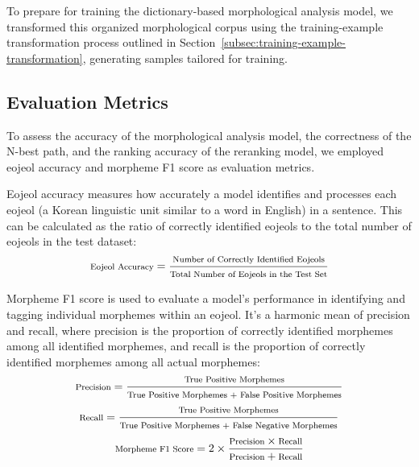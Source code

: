 \documentclass[AMS,STIX2COL]{WileyNJD-v2}
\begin{document}
    To prepare for training the dictionary-based morphological analysis model, we transformed this organized morphological corpus using the training-example transformation process outlined in Section~\ref{subsec:training-example-transformation}, generating samples tailored for training.

    \subsection{Evaluation Metrics}\label{subsec:evaluation-metrics}

    To assess the accuracy of the morphological analysis model, the correctness of the N-best path, and the ranking accuracy of the reranking model, we employed eojeol accuracy and morpheme F1 score as evaluation metrics.

    Eojeol accuracy measures how accurately a model identifies and processes each eojeol (a Korean linguistic unit similar to a word in English) in a sentence.
    This can be calculated as the ratio of correctly identified eojeols to the total number of eojeols in the test dataset:
    \vspace{1mm}
    \[
        \footnotesize
        \text{Eojeol Accuracy} = \frac{\text{Number of Correctly Identified Eojeols}}{\text{Total Number of Eojeols in the Test Set}}
    \]
    \vspace{0.5mm}

    Morpheme F1 score is used to evaluate a model's performance in identifying and tagging individual morphemes within an eojeol.
    It's a harmonic mean of precision and recall, where precision is the proportion of correctly identified morphemes among all identified morphemes, and recall is the proportion of correctly identified morphemes among all actual morphemes:
    \vspace{1mm}
    \[
        \footnotesize
        \text{Precision} = \frac{\text{True Positive Morphemes}}{\text{True Positive Morphemes + False Positive Morphemes}}
    \]
    \vspace{1mm}
    \[
        \footnotesize
        \text{Recall} = \frac{\text{True Positive Morphemes}}{\text{True Positive Morphemes + False Negative Morphemes}}
    \]
    \vspace{1mm}
    \[
        \footnotesize
        \text{Morpheme F1 Score} = 2 \times \frac{\text{Precision} \times \text{Recall}}{\text{Precision} + \text{Recall}}
    \]
    \vspace{0.5mm}
\end{document}
